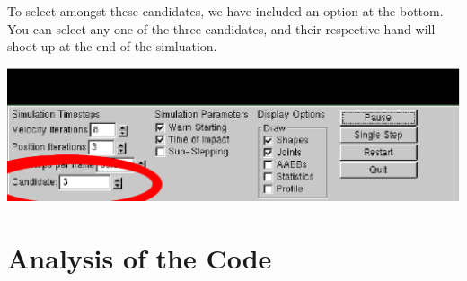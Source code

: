 \documentclass[a4paper,11pt]{article}
\begin{document}
To select amongst these candidates, we have included an option at the bottom. You can select any one of the three candidates, and their respective hand will shoot up at the end of the simluation.

\begin{center}
\includegraphics[scale=0.6]{doc/select1.eps}
\end{center}

\section{Analysis of the Code}
\end{document}
